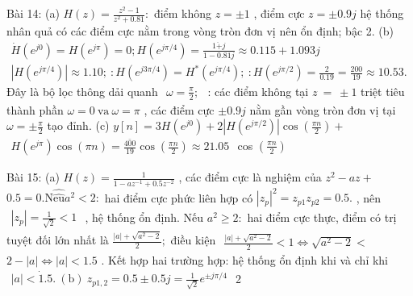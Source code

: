 \documentclass[
  10
]{article}
\begin{document}
Bài 14: (a)
\(H ( z ) = \frac { z ^ { 2 } - 1 } { z ^ { 2 } + 0 . 8 1 } \colon\)
điểm không \(z = \pm 1\) , điểm cực \(z = \pm 0 . 9 j\) hệ thống nhân
quả có các điểm cực nằm trong vòng tròn đơn vị nên ổn định; bậc 2. (b)
\(\begin{array} { r } { \dot { H } ( e ^ { j 0 } ) = H ( e ^ { j \pi } ) = 0 ; H ( e ^ { j \pi / 4 } ) = \frac { 1 \ddot { + } j } { 1 - 0 . 8 1 j } \approx 0 . 1 1 5 + 1 . 0 9 3 j } \end{array}\)
\(\begin{array} { r } { | H ( e ^ { j \pi / 4 } ) | \approx 1 . 1 0 ; \ : H ( e ^ { j 3 \pi / 4 } ) = H ^ { \ast } ( e ^ { j \pi / 4 } ) ; \ : H ( e ^ { j \pi / 2 } ) = \frac { 2 } { 0 . 1 9 } = \frac { 2 0 0 } { 1 9 } \approx 1 0 . 5 3 . } \end{array}\)
Đây là bộ lọc thông dải quanh
\(\begin{array} { r } { \omega = \frac { \pi } { 2 } ; } \end{array}\) :
các điểm không tại \(z ~ = ~ \pm 1\) triệt tiêu thành phần
\(\omega = 0 \mathrm { \ v a \ } \omega = \pi\) , các điểm cực
\(\pm 0 . 9 j\) nằm gần vòng tròn đơn vị tại
\(\omega = \pm \frac { \pi } { 2 }\) tạo đỉnh. (c)
\(y [ n ] = 3 H ( e ^ { j 0 } ) + 2 \left| H ( e ^ { j \pi / 2 } ) \right| \cos \left( { \textstyle { \frac { \pi n } { 2 } } } \right) +\)
\(\begin{array} { r } { H ( e ^ { j \pi } ) \cos ( \pi n ) = \frac { \bar { 4 0 0 } } { 1 9 } \cos \left( \frac { \pi n } { 2 } \right) \approx 2 1 . 0 5 } \end{array}\)
cos \(\textstyle \left( { \frac { \pi n } { 2 } } \right)\)

Bài 15: (a)
\(H ( z ) = { \frac { 1 } { 1 - a z ^ { - 1 } + 0 . 5 z ^ { - 2 } } }\)
, các điểm cực là nghiệm của \(z ^ { 2 } - a z +\)
\(0 . 5 = 0 . { \mathrm { N } } { \hat { \hat { \mathrm { e u } } } } a ^ { 2 } < 2 \colon\)
hai điểm cực phức liên hợp có
\(| z _ { p } | ^ { 2 } = z _ { p 1 } z _ { p 2 } = 0 . 5 .\) , nên
\(\begin{array} { r } { | z _ { p } | = \frac { 1 } { \sqrt { 2 } } < 1 } \end{array}\)
, hệ thống ổn định. Nếu \(a ^ { 2 } \geq 2 \colon\) hai điểm cực thực,
điểm có trị tuyệt đối lớn nhất là
\({ \frac { | a | + { \sqrt { a ^ { 2 } - 2 } } } { 2 } } ;\) điều kiện
\(\begin{array} { r } { \frac { | a | + \sqrt { a ^ { 2 } - 2 } } { 2 } < 1 \Leftrightarrow \sqrt { a ^ { 2 } - 2 } < } \end{array}\)
\(2 - | a | \Leftrightarrow | a | < 1 . 5\) . Kết hợp hai trường hợp: hệ
thống ổn định khi và chỉ khi
\(\begin{array} { r } { | a | < \dot { 1 } . 5 . \ \mathrm { ( b ) } \ z _ { p 1 , 2 } = 0 . 5 \pm 0 . 5 j = \frac { 1 } { \sqrt { 2 } } e ^ { \pm j \pi / 4 } } \end{array}\)
2
\end{document}

